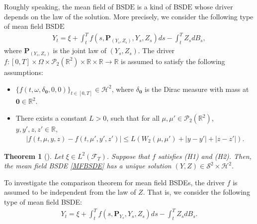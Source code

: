 \documentclass[10pt]{article}%
\numberwithin{equation}{section}
\newtheorem{theorem}{Theorem}[section]
\def \P{\mathbf{P}}
\begin{document}
Roughly speaking, the mean field of $\text{BSDE}$ is a kind of $\text{BSDE}$ whose driver depends on the law of the solution. More precisely, we consider the following type of mean field $\text{BSDE}$
\begin{align}\label{MFBSDE}
Y_t=\xi+\int_t^T f(s,\P_{(Y_s,Z_s)},Y_s,Z_s)ds-\int_t^T Z_s dB_s,
\end{align}
where $\P_{(Y_s,Z_s)}$ is the joint law of $(Y_s,Z_s)$. The driver $f:[0,T]\times\Omega\times \mathcal{P}_2(\mathbb{R}^2)\times \mathbb{R}\times\mathbb{R}\rightarrow \mathbb{R}$ is assumed to satisfy the following assumptions:

\begin{itemize}
\item[(H1)] $\{f(t,\omega,\delta_{\textbf{0}},0,0)\}_{t\in[0,T]}\in \mathcal{H}^2$, where $\delta_{\textbf{0}}$ is the Dirac measure with mass at $\textbf{0}\in \mathbb{R}^2$.
\item[(H2)] There exists a constant $L>0$, such that for all $\mu,\mu'\in\mathcal{P}_2(\mathbb{R}^2)$, $y,y',z,z'\in\mathbb{R}$,
\begin{align*}
|f(t,\mu,y,z)-f(t,\mu',y',z')|\leq L(W_2(\mu,\mu')+|y-y'|+|z-z'|).
\end{align*}
\end{itemize}

\begin{theorem}[\cite{LLZ}]\label{existence and uniqueness for MFBSDE}
Let $\xi\in L^2(\mathcal{F}_T)$. Suppose that $f$ satisfies (H1) and (H2). Then, the mean field BSDE \eqref{MFBSDE} has a unique solution $(Y,Z)\in \mathcal{S}^2\times \mathcal{H}^2$.
\end{theorem}

To investigate the comparison theorem for mean field BSDEs, the driver $f$ is assumed to be independent from the law of $Z$. That is, we consider the following type of mean field BSDE:
\begin{align}\label{MFBSDE'}
Y_t=\xi+\int_t^T f(s,\P_{Y_s},Y_s,Z_s)ds-\int_t^T Z_s dB_s.
\end{align}
\end{document}
